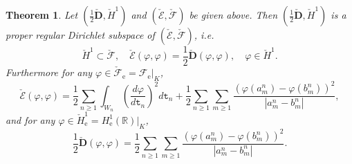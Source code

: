 \documentclass[a4paper]{amsart}
\newtheorem{theorem}{Theorem}[section]
\theoremstyle{definition}
\theoremstyle{remark}
\numberwithin{equation}{section}
\begin{document}
\begin{theorem}\label{THM38}
Let $(\frac{1}{2}\check{\mathbf{D}}, \check{H}^1)$ and $(\check{{\mathcal{E}}},\check{{\mathcal{F}}})$ be given above. Then $(\frac{1}{2}\check{\mathbf{D}}, \check{H}^1)$ is a proper regular Dirichlet subspace of $(\check{{\mathcal{E}}},\check{{\mathcal{F}}})$, i.e.
\[
\check{H}^1\subset \check{{\mathcal{F}}},\quad \check{{\mathcal{E}}}(\varphi, \varphi)=\frac{1}{2}\check{\mathbf{D}}(\varphi, \varphi),\quad \varphi\in \check{H}^1.
\]
Furthermore for any $\varphi\in \check{{\mathcal{F}}}_\mathrm{e}={{\mathcal{F}}}_\mathrm{e}|_{K}$,
\begin{equation}\label{EQ3EVV}
	\check{{\mathcal{E}}}(\varphi, \varphi)=\frac{1}{2}\sum_{n\geq 1}\int_{W_n}\left(\frac{d\varphi}{d{{\mathtt{t}}}_n}\right)^2d{{\mathtt{t}}}_n+\frac{1}{2}\sum_{n\geq 1}\sum_{m\geq 1} \frac{(\varphi(a_m^n)-\varphi(b^n_m))^2}{|a_m^n-b_m^n|},
\end{equation}
and for any $\varphi\in \check{H}^1_\mathrm{e}=H^1_\mathrm{e}(\mathbb{R})|_{K}$,
\begin{equation}\label{EQ3DVV}
\frac{1}{2}\check{\mathbf{D}}(\varphi, \varphi)= \frac{1}{2}\sum_{n\geq 1}\sum_{m\geq 1} \frac{(\varphi(a_m^n)-\varphi(b^n_m))^2}{|a_m^n-b_m^n|}.
\end{equation}
\end{theorem}
\end{document}

